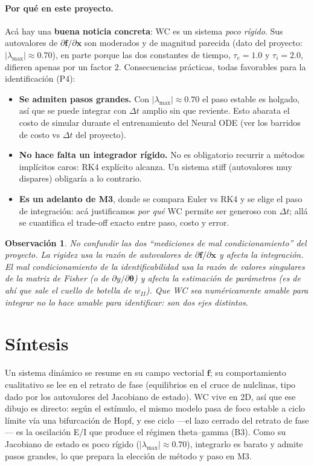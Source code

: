 \documentclass[11pt,a4paper]{article}
\newtheorem{remark}{Observación}
\newcommand{\thetavec}{\bm{\theta}}
\begin{document}
\paragraph{Por qué en este proyecto.} Acá hay una \textbf{buena noticia concreta}: WC es un sistema \emph{poco rígido}. Sus autovalores de $\partial\mathbf{f}/\partial\mathbf{x}$ son moderados y de magnitud parecida (dato del proyecto: $|\lambda_{\max}|\approx 0.70$), en parte porque las dos constantes de tiempo, $\tau_e=1.0$ y $\tau_i=2.0$, difieren apenas por un factor $2$. Consecuencias prácticas, todas favorables para la identificación (P4):
\begin{itemize}[nosep,leftmargin=1.4em]
\item \textbf{Se admiten pasos grandes.} Con $|\lambda_{\max}|\approx0.70$ el paso estable es holgado, así que se puede integrar con $\Delta t$ amplio sin que reviente. Esto abarata el costo de simular durante el entrenamiento del Neural ODE (ver los barridos de costo vs $\Delta t$ del proyecto).
\item \textbf{No hace falta un integrador rígido.} No es obligatorio recurrir a métodos implícitos caros: RK4 explícito alcanza. Un sistema stiff (autovalores muy dispares) obligaría a lo contrario.
\item \textbf{Es un adelanto de M3}, donde se compara Euler vs RK4 y se elige el paso de integración: acá justificamos \emph{por qué} WC permite ser generoso con $\Delta t$; allá se cuantifica el trade-off exacto entre paso, costo y error.
\end{itemize}

\begin{remark}
No confundir las dos ``mediciones de mal condicionamiento'' del proyecto. La rigidez usa la razón de autovalores de $\partial\mathbf{f}/\partial\mathbf{x}$ y afecta la \emph{integración}. El mal condicionamiento de la identificabilidad usa la razón de valores singulares de la matriz de Fisher (o de $\partial y/\partial\thetavec$) y afecta la \emph{estimación de parámetros} (es de ahí que sale el cuello de botella de $w_{II}$). Que WC sea numéricamente amable para integrar no lo hace amable para identificar: son dos ejes distintos.
\end{remark}

\section*{Síntesis}
Un sistema dinámico se resume en su campo vectorial $\mathbf{f}$; su comportamiento cualitativo se lee en el retrato de fase (equilibrios en el cruce de nulclinas, tipo dado por los autovalores del Jacobiano de estado). WC vive en 2D, así que ese dibujo es directo: según el estímulo, el mismo modelo pasa de foco estable a ciclo límite vía una bifurcación de Hopf, y ese ciclo ---el lazo cerrado del retrato de fase--- es la oscilación E/I que produce el régimen theta--gamma (B3). Como su Jacobiano de estado es poco rígido ($|\lambda_{\max}|\approx0.70$), integrarlo es barato y admite pasos grandes, lo que prepara la elección de método y paso en M3.
\end{document}
